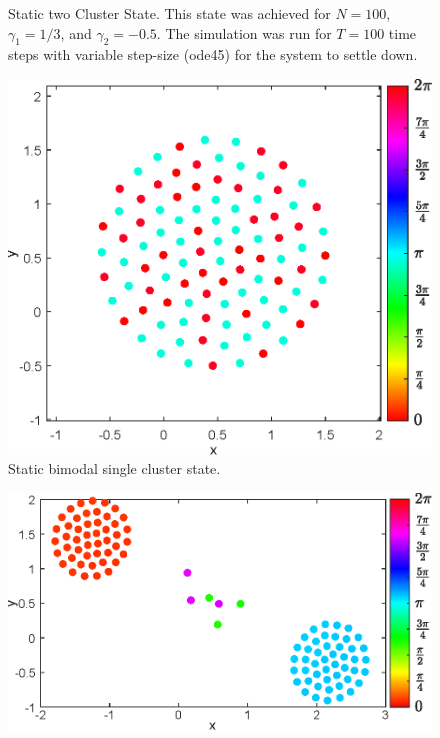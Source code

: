 \documentclass[twocolumn,10pt]{asme2ej}
\begin{document}
{\begin{figure}[h!]
        \caption{Static two Cluster State. This state was achieved for \(N = 100\), \(\gamma_1 = 1/3\), and \(\gamma_2 = -0.5\). The simulation was run for \(T = 100\) time steps with variable step-size (ode45) for the system to settle down.}
        \vspace{-12mm}
        \label{fig:static2}
    \end{figure}
    \begin{figure}
        \includegraphics[width = \linewidth]{staticSingleClusterState.eps}
        \caption{Static bimodal single cluster state.}
        \label{fig:staticSingleClusterState}
    \end{figure}
    \begin{figure}[h!]
        \includegraphics[width = \linewidth]{twoClustersWithR100.eps}

\end{figure}}
\end{document}
